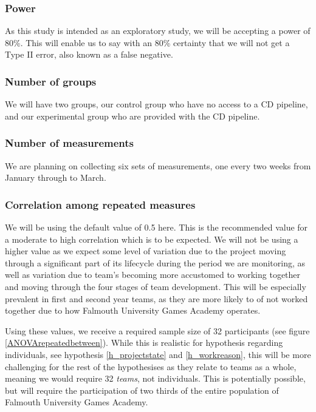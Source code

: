 \documentclass[lettersize,journal]{IEEEtran}
\begin{document}
        \subsubsection*{Power}
            As this study is intended as an exploratory study, we will be accepting a power of 80\%. This will enable us to say with an 80\% certainty that we will not get a Type II error, also known as a false negative\cite{errortype}.\\

        \subsubsection*{Number of groups}
            We will have two groups, our control group who have no access to a CD pipeline, and our experimental group who are provided with the CD pipeline.\\

        \subsubsection*{Number of measurements}
            We are planning on collecting six sets of measurements, one every two weeks from January through to March.\\
            
        \subsubsection*{Correlation among repeated measures}
            We will be using the default value of 0.5 here. This is the recommended value for a moderate to high correlation\cite{gpowerguide} which is to be expected. We will not be using a higher value as we expect some level of variation due to the project moving through a significant part of its lifecycle during the period we are monitoring, as well as variation due to team's becoming more accustomed to working together and moving through the four stages of team development\cite{tuckman1965developmental}. This will be especially prevalent in first and second year teams, as they are more likely to of not worked together due to how Falmouth University Games Academy operates.

        Using these values, we receive a required sample size of 32 participants (see figure \ref{ANOVArepeatedbetween}). While this is realistic for hypothesis regarding individuals, see hypothesis \ref{h_projectstate} and \ref{h_workreason}, this will be more challenging for the rest of the hypothesises as they relate to teams as a whole, meaning we would require 32 \textit{teams}, not individuals. This is potentially possible, but will require the participation of two thirds of the entire population of Falmouth University Games Academy.
\end{document}
